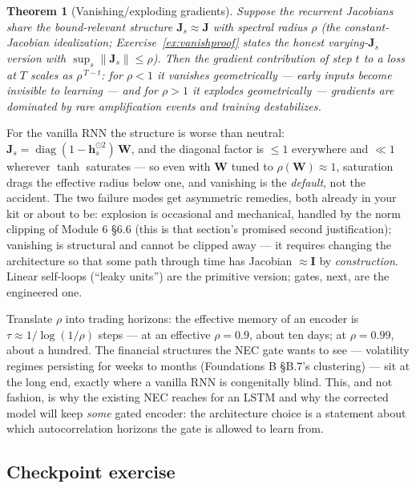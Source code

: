 \documentclass[11pt]{article}
\numberwithin{equation}{section}
\theoremstyle{plain}
\newtheorem{theorem}{Theorem}[section]
\theoremstyle{definition}
\theoremstyle{remark}
\newcounter{exercise}
\DeclareMathOperator{\diag}{diag}
\newcommand{\bh}{\bm{h}}
\newcommand{\bW}{\bm{W}}
\newcommand{\bJ}{\bm{J}}
\begin{document}
\begin{theorem}[Vanishing/exploding gradients]\label{thm:vanish}
Suppose the recurrent Jacobians share the bound-relevant structure $\bJ_s \approx \bJ$ with spectral radius $\rho$ (the constant-Jacobian idealization; Exercise~\ref{ex:vanishproof} states the honest varying-$\bJ_s$ version with $\sup_s \|\bJ_s\| \le \rho$). Then the gradient contribution of step $t$ to a loss at $T$ scales as $\rho^{\,T - t}$: for $\rho < 1$ it \emph{vanishes} geometrically --- early inputs become invisible to learning --- and for $\rho > 1$ it \emph{explodes} geometrically --- gradients are dominated by rare amplification events and training destabilizes.
\end{theorem}

For the vanilla RNN the structure is worse than neutral: $\bJ_s = \diag(1 - \bh_s^{\odot 2})\,\bW$, and the diagonal factor is $\le 1$ everywhere and $\ll 1$ wherever $\tanh$ saturates --- so even with $\bW$ tuned to $\rho(\bW) \approx 1$, saturation drags the effective radius below one, and vanishing is the \emph{default}, not the accident. The two failure modes get asymmetric remedies, both already in your kit or about to be: explosion is occasional and mechanical, handled by the norm clipping of Module 6 \S6.6 (this is that section's promised second justification); vanishing is structural and cannot be clipped away --- it requires changing the architecture so that some path through time has Jacobian $\approx \bm I$ by \emph{construction}. Linear self-loops (``leaky units'') are the primitive version; gates, next, are the engineered one.

\begin{finbox}
Translate $\rho$ into trading horizons: the effective memory of an encoder is $\tau \approx 1/\log(1/\rho)$ steps --- at an effective $\rho = 0.9$, about ten days; at $\rho = 0.99$, about a hundred. The financial structures the NEC gate wants to see --- volatility regimes persisting for weeks to months (Foundations B \S B.7's clustering) --- sit at the long end, exactly where a vanilla RNN is congenitally blind. This, and not fashion, is why the existing NEC reaches for an LSTM and why the corrected model will keep \emph{some} gated encoder: the architecture choice is a statement about which autocorrelation horizons the gate is allowed to learn from.
\end{finbox}


\subsection*{Checkpoint exercise}
\end{document}
